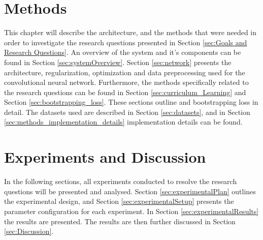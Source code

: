 \documentclass[a4paper]{book}
\begin{document}
\chapter{Methods}
\label{cha:architectureAndModel}
This chapter will describe the architecture, and the methods that were needed in order to investigate the research questions presented in Section \ref{sec:Goals and Research Questions}. An overview of the system and it's components can be found in Section \ref{sec:systemOverview}. Section \ref{sec:network} presents the architecture, regularization, optimization and data preprocessing used for the convolutional neural network. Furthermore, the methods specifically related to the research questions can be found in Section \ref{sec:curriculum_Learning} and Section \ref{sec:bootstrapping_loss}. These sections outline  and bootstrapping loss  in detail. The datasets used are described in Section \ref{sec:datasets}, and in Section \ref{sec:methods_implementation_details} implementation details can be found.














\chapter{Experiments and Discussion}
In the following sections, all experiments conducted to resolve the research questions will be presented and analysed. Section \ref{sec:experimentalPlan} outlines the experimental design, and Section \ref{sec:experimentalSetup} presents the parameter configuration for each experiment. In Section \ref{sec:experimentalResults} the results are presented. The results are then further discussed in Section \ref{sec:Discussion}.
\label{cha:ResearchAndResults}








\end{document}
